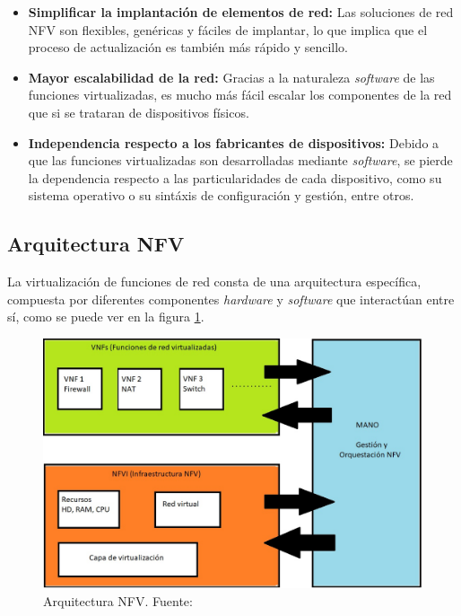 \begin{itemize}
	\item \textbf{Simplificar la implantación de elementos de red:} Las soluciones de red \ac{NFV} son flexibles, genéricas y fáciles de implantar, lo que implica que el proceso de actualización es también más rápido y sencillo.
	
	\item \textbf{Mayor escalabilidad de la red:} Gracias a la naturaleza \textit{software} de las funciones virtualizadas, es mucho más fácil escalar los componentes de la red que si se trataran de dispositivos físicos.
	
	\item \textbf{Independencia respecto a los fabricantes de dispositivos:} Debido a que las funciones virtualizadas son desarrolladas mediante \textit{software}, se pierde la dependencia respecto a las particularidades de cada dispositivo, como su sistema operativo o su sintáxis de configuración y gestión, entre otros.
\end{itemize}

\subsection{Arquitectura NFV}
\label{subsec:nfvarq}

La virtualización de funciones de red consta de una arquitectura específica, compuesta por diferentes componentes \textit{hardware} y \textit{software} que interactúan entre sí, como se puede ver en la figura \ref{fig:arquitecturanfv}.

\begin{figure}[!ht]
	\centering
	\includegraphics[width=0.75\linewidth]{imagenes/arquitectura_nfv}
	\caption{Arquitectura NFV. Fuente:\cite{nfvbib}}
	\label{fig:arquitecturanfv}
\end{figure}

